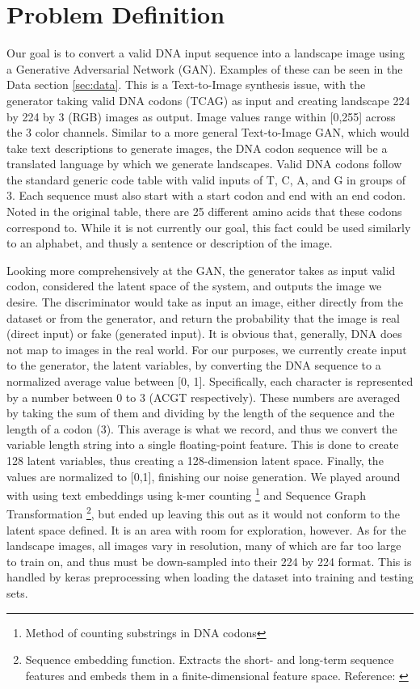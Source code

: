 \documentclass{article}
\begin{document}
	\section{Problem Definition}
	\label{sec:problemdef}
	Our goal is to convert a valid DNA input sequence into a landscape image using a Generative Adversarial Network (GAN). Examples of these can be seen in the Data section \ref{sec:data}. This is a Text-to-Image synthesis issue, with the generator taking valid DNA codons (TCAG) as input and creating landscape 224 by 224 by 3 (RGB) images as output. Image values range within [0,255] across the 3 color channels. Similar to a more general Text-to-Image GAN, which would take text descriptions to generate images, the DNA codon sequence will be a translated language by which we generate landscapes. Valid DNA codons follow the standard generic code table with valid inputs of T, C, A, and G in groups of 3. Each sequence must also start with a start codon and end with an end codon. Noted in the original table, there are 25 different amino acids that these codons correspond to. While it is not currently our goal, this fact could be used similarly to an alphabet, and thusly a sentence or description of the image.  

	Looking more comprehensively at the GAN, the generator takes as input valid codon, considered the latent space of the system, and outputs the image we desire. The discriminator would take as input an image, either directly from the dataset or from the generator, and return the probability that the image is real (direct input) or fake (generated input). It is obvious that, generally, DNA does not map to images in the real world. For our purposes, we currently create input to the generator, the latent variables, by converting the DNA sequence to a normalized average value between [0, 1]. Specifically, each character is represented by a number between 0 to 3 (ACGT respectively). These numbers are averaged by taking the sum of them and dividing by the length of the sequence and the length of a codon (3). This average is what we record, and thus we convert the variable length string into a single floating-point feature. This is done to create 128 latent variables, thus creating a 128-dimension latent space. Finally, the values are normalized to [0,1], finishing our noise generation. We played around with using text embeddings using k-mer counting \footnote{Method of counting substrings in DNA codons} and Sequence Graph Transformation \footnote{Sequence embedding function. Extracts the short- and long-term sequence features and embeds them in a finite-dimensional feature space. Reference: \url{}}, but ended up leaving this out as it would not conform to the latent space defined. It is an area with room for exploration, however. As for the landscape images, all images vary in resolution, many of which are far too large to train on, and thus must be down-sampled into their 224 by 224 format. This is handled by keras preprocessing when loading the dataset into training and testing sets. 
\end{document}
